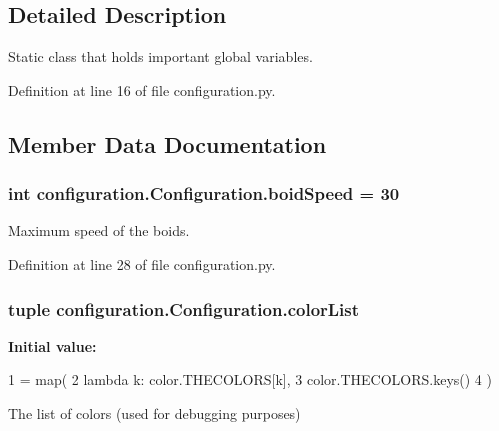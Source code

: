 \subsection{Detailed Description}
Static class that holds important global variables. 

Definition at line 16 of file configuration.\-py.



\subsection{Member Data Documentation}
\hypertarget{classconfiguration_1_1Configuration_a5062047bc933b81cbbaa841e20cb2a67}{
\subsubsection[{boid\-Speed}]{\setlength{\rightskip}{0pt plus 5cm}int configuration.\-Configuration.\-boid\-Speed = 30\hspace{0.3cm}{\ttfamily [static]}}}\label{classconfiguration_1_1Configuration_a5062047bc933b81cbbaa841e20cb2a67}


Maximum speed of the boids. 



Definition at line 28 of file configuration.\-py.

\hypertarget{classconfiguration_1_1Configuration_a2140643801852e373bfddf9945cf26f8}{
\subsubsection[{color\-List}]{\setlength{\rightskip}{0pt plus 5cm}tuple configuration.\-Configuration.\-color\-List\hspace{0.3cm}{\ttfamily [static]}}}\label{classconfiguration_1_1Configuration_a2140643801852e373bfddf9945cf26f8}
{\bfseries Initial value\-:}
\begin{DoxyCode}
1 = map(
2         \textcolor{keyword}{lambda} k: color.THECOLORS[k],
3         color.THECOLORS.keys()
4     )
\end{DoxyCode}


The list of colors (used for debugging purposes) 



